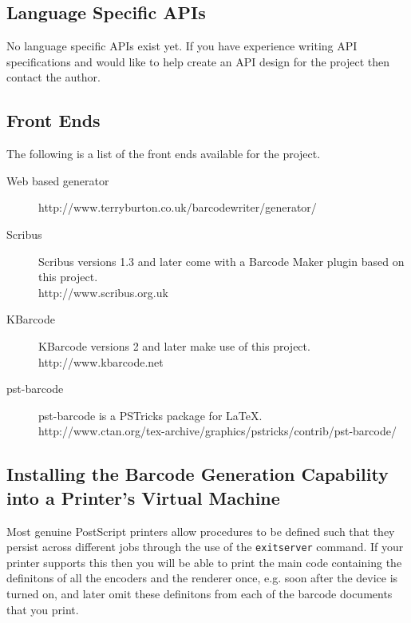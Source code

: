 \documentclass []{article}
\begin{document}
\subsection{Language Specific APIs}

No language specific APIs exist yet. If you have experience writing API
specifications and would like to help create an API design for the project
then contact the author.

\subsection{Front Ends}

The following is a list of the front ends available for the project.

\begin{description}

\item[Web based generator]{
\mbox{http://www.terryburton.co.uk/barcodewriter/generator/}
}

\item[Scribus]
Scribus versions 1.3 and later come with a Barcode Maker plugin based on this project.\\
\mbox{http://www.scribus.org.uk}

\item[KBarcode]
KBarcode versions 2 and later make use of this project.\\ 
\mbox{http://www.kbarcode.net}

\item[pst-barcode]{
pst-barcode is a PSTricks package for \LaTeX.\\
\mbox{http://www.ctan.org/tex-archive/graphics/pstricks/contrib/pst-barcode/}

}
\end{description}

\newpage

\subsection{Installing the Barcode Generation Capability into a Printer's Virtual Machine}

Most genuine PostScript printers allow procedures to be defined such 
that they persist across different jobs through the use of the \texttt{exitserver}
command. If your printer supports this then you will be able to print
the main code containing the definitons of all the encoders and the
renderer once, e.g. soon after the device is turned on, and later omit
these definitons from each of the barcode documents that you print.
\end{document}
